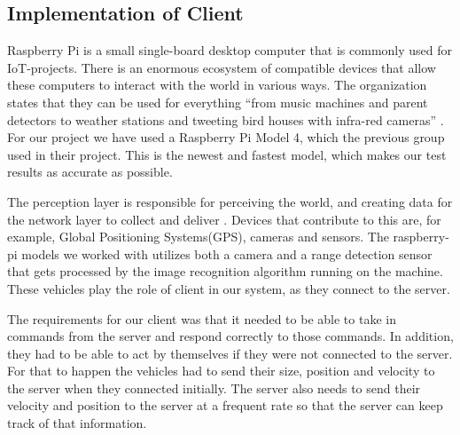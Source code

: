 \subsection{Implementation of Client}
Raspberry Pi is a small single-board desktop computer that is commonly used for IoT-projects. There is an enormous ecosystem of compatible devices that allow these computers to interact with the world in various ways. The organization states that they can be used for everything “from music machines and parent detectors to weather stations and tweeting bird houses with infra-red cameras” \parencite{raspberrypi}.  For our project we have used a Raspberry Pi Model 4, which the previous group used in their project. This is the newest and fastest model, which makes our test results as accurate as possible.  

The perception layer is responsible for perceiving the world, and creating data for the network layer to collect and deliver \parencite[pp. 8-9]{iot_platforms}. Devices that contribute to this are, for example, Global Positioning Systems(GPS), cameras and sensors. The raspberry-pi models we worked with utilizes both a camera and a range detection sensor that gets processed by the image recognition algorithm running on the machine. These vehicles play the role of client in our system, as they connect to the server. 

The requirements for our client was that it needed to be able to take in commands from the server and respond correctly to those commands. In addition, they had to be able to act by themselves if they were not connected to the server. For that to happen the vehicles had to send their size, position and velocity to the server when they connected initially. The server also needs to send their velocity and position to the server at a frequent rate so that the server can keep track of that information.